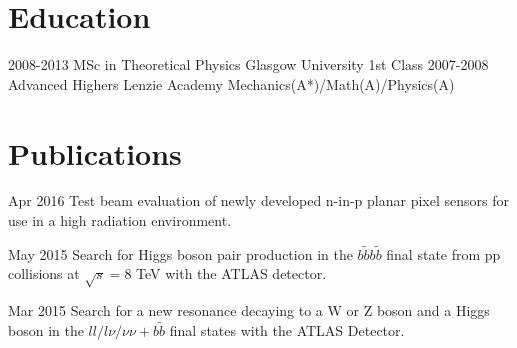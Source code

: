 \documentclass[]{twentysecondcv}
\begin{document}

\section*{Education}

\begin{twenty}
  \twentyitem
    {2008-2013}
    {MSc in Theoretical Physics }
    {Glasgow University}
    {1st Class}
  \twentyitem
    {2007-2008}
    {Advanced Highers}
    {Lenzie Academy}
    {Mechanics(A*)/Math(A)/Physics(A)}
\end{twenty}



\section*{Publications}

\begin{twentyshort}
  \twentyitemshort
    {Apr 2016}
    {Test beam evaluation of newly developed n-in-p planar pixel sensors for use in a high radiation environment.}
\end{twentyshort}

\begin{twentyshort}
  \twentyitemshort
    {May 2015}
    {Search for Higgs boson pair production in the $b\tilde{b}b\tilde{b}$ final state from pp collisions at $\sqrt{s}=8$ TeV with the ATLAS detector.}
\end{twentyshort}

\begin{twentyshort}
  \twentyitemshort
    {Mar 2015}
    {Search for a new resonance decaying to a W or Z boson and a Higgs boson in the $ll/l\nu/\nu\nu+b\tilde{b}$ final states with the ATLAS Detector.}
\end{twentyshort}
\end{document}
